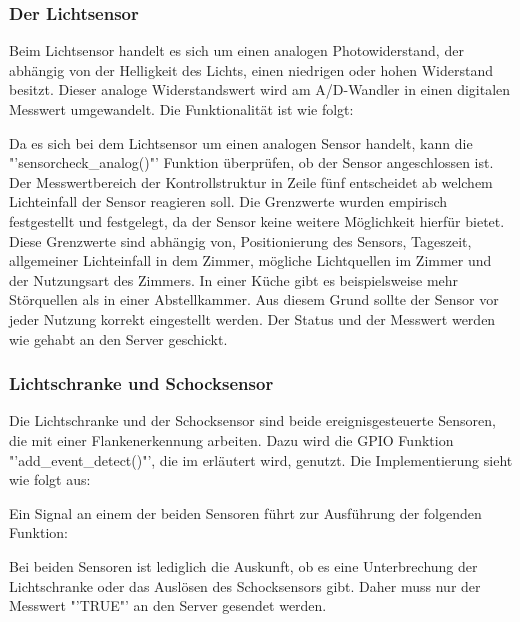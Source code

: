 \subsubsection*{Der Lichtsensor}
	Beim Lichtsensor handelt es sich um einen analogen Photowiderstand, der abhängig von der Helligkeit des Lichts, einen niedrigen oder hohen Widerstand besitzt. Dieser analoge Widerstandswert wird am \ac{A/D-Wandler} in einen digitalen Messwert umgewandelt. Die Funktionalität ist wie folgt:
	
	Da es sich bei dem Lichtsensor um einen analogen Sensor handelt, kann die "'sensorcheck\_analog()"' Funktion überprüfen, ob der Sensor angeschlossen ist. Der Messwertbereich der Kontrollstruktur in Zeile fünf entscheidet ab welchem Lichteinfall der Sensor reagieren soll. Die Grenzwerte wurden empirisch festgestellt und festgelegt, da der Sensor keine weitere Möglichkeit hierfür bietet. Diese Grenzwerte sind abhängig von, Positionierung des Sensors, Tageszeit, allgemeiner Lichteinfall in dem Zimmer, mögliche Lichtquellen im Zimmer und der Nutzungsart des Zimmers. In einer Küche gibt es beispielsweise mehr Störquellen als in einer Abstellkammer. Aus diesem Grund sollte der Sensor vor jeder Nutzung korrekt eingestellt werden. Der Status und der Messwert werden wie gehabt an den Server geschickt.
	
\subsubsection*{Lichtschranke und Schocksensor}
	Die Lichtschranke und der Schocksensor sind beide ereignisgesteuerte Sensoren, die mit einer Flankenerkennung arbeiten. Dazu wird die GPIO Funktion "'add\_event\_detect()"', die im  erläutert wird, genutzt. Die Implementierung sieht wie folgt aus:
	
	Ein Signal an einem der beiden Sensoren führt zur Ausführung der folgenden Funktion:
	
	Bei beiden Sensoren ist lediglich die Auskunft, ob es eine Unterbrechung der Lichtschranke oder das Auslösen des Schocksensors gibt. Daher muss nur der Messwert "'TRUE"' an den Server gesendet werden.
